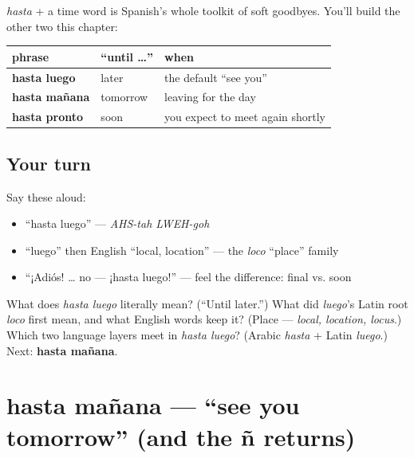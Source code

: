 \begin{grammarlens}[title={Grammar Lens: the \textquotedblleft{}hasta …\textquotedblright{} family}]
\emph{hasta} + a time word is Spanish's whole toolkit of soft goodbyes. You'll build the other two this chapter:

\noindent
\begin{tabularx}{\linewidth}{@{}>{\raggedright\arraybackslash}X>{\raggedright\arraybackslash}X>{\raggedright\arraybackslash}X@{}}
\toprule
\textbf{phrase} & \textbf{\textquotedblleft{}until …\textquotedblright{}} & \textbf{when} \\
\midrule
\textbf{hasta luego} & later & the default \textquotedblleft{}see you\textquotedblright{} \\
\textbf{hasta mañana} & tomorrow & leaving for the day \\
\textbf{hasta pronto} & soon & you expect to meet again shortly \\
\bottomrule
\end{tabularx}
\end{grammarlens}

\subsection*{Your turn}
Say these aloud:

\begin{itemize}
\raggedright
  \item \textquotedblleft{}hasta luego\textquotedblright{} — \emph{AHS-tah LWEH-goh}
  \item \textquotedblleft{}luego\textquotedblright{} then English \textquotedblleft{}local, location\textquotedblright{} — the \emph{loco} \textquotedblleft{}place\textquotedblright{} family
  \item \textquotedblleft{}¡Adiós! … no — ¡hasta luego!\textquotedblright{} — feel the difference: final vs. soon
\end{itemize}

\begin{tcolorbox}[breakable,colback=teal!4,colframe=teal!35!black,title={Before you move on}]
What does \emph{hasta luego} literally mean? (\textquotedblleft{}Until later.\textquotedblright{}) What did \emph{luego}'s Latin root \emph{loco} first mean, and what English words keep it? (Place — \emph{local, location, locus}.) Which two language layers meet in \emph{hasta luego}? (Arabic \emph{hasta} + Latin \emph{luego}.) Next: \textbf{hasta mañana}.
\end{tcolorbox}
\section[hasta mañana]{hasta mañana — \textquotedblleft{}see you tomorrow\textquotedblright{} (and the ñ returns)}

